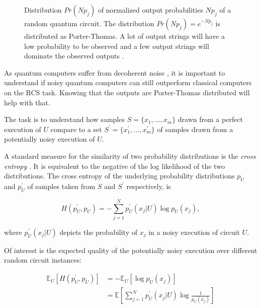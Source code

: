 \begin{figure}[H]
  \centering
  \caption[Output Distribution of Random Quantum Circuits]{Distribution $Pr(Np_j)$ of normalized output probabilities $Np_j$ of a
    random quantum circuit. The distribution $Pr(Np_j)=e^{-Np_j}$ is distributed as
    Porter-Thomas. A lot of output strings will have a low probability to be
    observed and a few output strings will dominate the observed outputs \cite{Boixo2018supremacy}.}
  \label{fig:porterthomas}
\end{figure}

As quantum computers suffer from decoherent noise \cite{Zeh:1970zz}, it is
important to understand if noisy quantum computers can still
outperform classical computers on the RCS task. Knowing that the outputs are
Porter-Thomas distributed will help with that.

The task is to understand how samples $S=\{x_1,\dots,x_m\}$ drawn from a perfect execution of
$U$ compare to a set $S^{\prime}=\{x_1^{\prime},\dots,x_m^{\prime}\}$ of samples drawn from a potentially noisy
execution of $U$.

A standard measure for the similarity of two probability distributions is the \textit{cross entropy} \cite{kullback1951}.
It is equivalent to the negative of the log likelihood of the two distributions.
The cross entropy of the underlying
probability distributions $p_U$ and $p_U^{\prime}$ of samples taken from $S$ and $S^{\prime}$ respectively, is

\begin{equation}
  H(p_U^{\prime},p_U) = - \sum_{j=1}^Np_U^{\prime}(x_j|U) \log{p_U(x_j)},
\end{equation}

where $p_U^{\prime}(x_j|U)$ depicts the probability of $x_j$ in a noisy execution of circuit $U$.

Of interest is the expected quality of the potentially noisy execution over
different random circuit instances:

\begin{align}
  \label{eq:expectedCrossDifference}
  \mathbb{E}_U[H(p_U^{\prime},p_U)] &= -\mathbb{E}_U[\log{p_U(x_j)}] \\
                                    &= \mathbb{E} \left[\sum_{j=1}^Np_U^{\prime}(x_j|U)\log{\frac{1}{p_U(x_j)}}\right]
\end{align}

